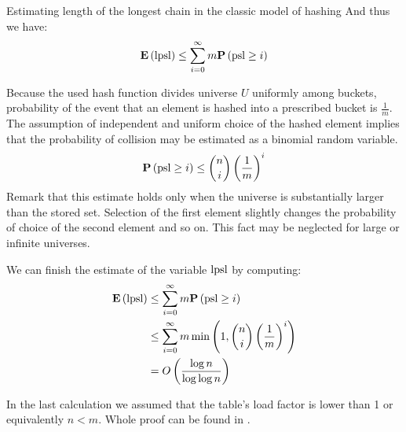 \begin{section}{Estimating length of the longest chain in the classic model of hashing}
And thus we have:
\begin{displaymath}
\mathbf{E}\left(\mathrm{lpsl}\right) \leq \displaystyle \sum_{i = 0}^{\infty} m \mathbf{P}\left(\mathrm{psl} \geq i\right)
\end{displaymath}

Because the used hash function divides universe $U$ uniformly among buckets, probability of the event that an element is hashed into a prescribed bucket is $\frac{1}{m}$. The assumption of independent and uniform choice of the hashed element implies that the probability of collision may be estimated as a binomial random variable. 
\begin{displaymath}
\mathbf{P}\left(\mathrm{psl} \geq i\right) \leq \dbinom{n}{i}\left(\frac{1}{m}\right)^i
\end{displaymath}
Remark that this estimate holds only when the universe is substantially larger than the stored set. Selection of the first element slightly changes the probability of choice of the second element and so on. This fact may be neglected for large or infinite universes.

We can finish the estimate of the variable $\mathrm{lpsl}$ by computing:
\begin{displaymath}
\begin{split}
\mathbf{E}\left(\mathrm{lpsl}\right)	& \leq \displaystyle \sum_{i = 0}^{\infty} m \mathbf{P}\left(\mathrm{psl} \geq i\right) \\
		& \leq \displaystyle \sum_{i = 0}^{\infty} m \min\left(1, \dbinom{n}{i}\left(\frac{1}{m}\right)^i\right) \\
		& = O\left(\frac{\log n}{\log \log n}\right)
\end{split}
\end{displaymath}

In the last calculation we assumed that the table's load factor is lower than 1 or equivalently $n < m$. Whole proof can be found in \cite{DBLP:books/sp/Mehlhorn84}.
\end{section}

